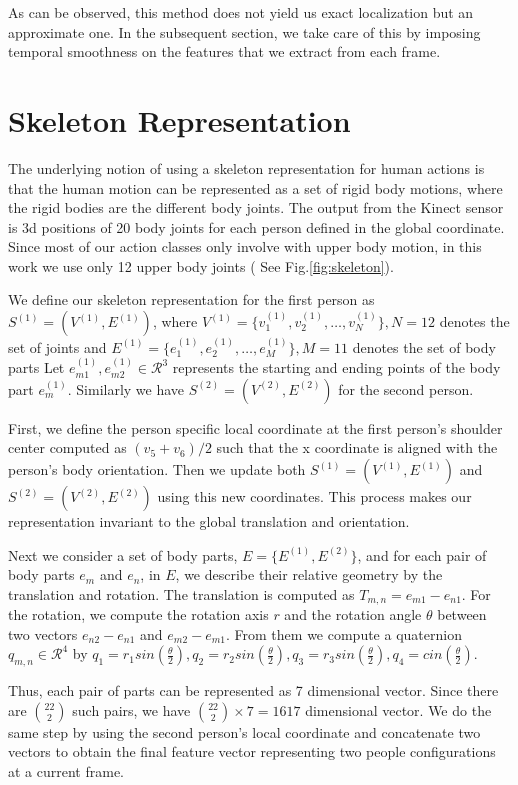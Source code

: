 \documentclass[10pt,twocolumn,letterpaper]{article}
\begin{document}
As can be observed, this method does not yield us exact localization but an approximate one. In the subsequent section, we take care of this by imposing temporal smoothness on the features that we extract from each frame. 


\section{Skeleton Representation}\label{sec:Feat}

The underlying notion of using a skeleton representation for human actions is that the human motion can be represented as a set of rigid body motions, where the rigid bodies are the different body joints. The output from the Kinect sensor is 3d positions of 20 body joints for each person defined in the global coordinate. Since most of our action classes only involve with upper body motion, in this work we use only 12 upper body joints ( See Fig.\ref{fig:skeleton}).

We define our skeleton representation for the first person as $S^{(1)}=(V^{(1)},E^{(1)})$, where $V^{(1)}=\{v_{1}^{(1)},v_{2}^{(1)},\dots,v_{N}^{(1)}\}, N=12$ denotes the set of joints and $E^{(1)}=\{e_{1}^{(1)},e_{2}^{(1)},\dots,e_{M}^{(1)}\}, M=11$ denotes the set of body parts  Let $e_{m1}^{(1)},e_{m2}^{(1)} \in \mathcal{R}^3$ represents the starting and ending points of the body part $e_{m}^{(1)}$. Similarly we have $S^{(2)}=(V^{(2)},E^{(2)})$ for the second person.

First, we define the person specific local coordinate at the first person's shoulder center computed as $(v_5 + v_6)/2$ such that the x coordinate is aligned with the person's body orientation. Then we update both $S^{(1)}=(V^{(1)},E^{(1)})$ and $S^{(2)}=(V^{(2)},E^{(2)})$ using this new coordinates. This process makes our representation invariant to the global translation and orientation. 

Next we consider a set of body parts, $E=\{E^{(1)},E^{(2)}\}$, and for each pair of body parts $e_m$ and $e_n$, in $E$, we describe their relative geometry by the translation and rotation. The translation is computed as $T_{m,n}=e_{m1}-e_{n1}$. For the rotation, we compute the rotation axis $r$ and the rotation angle $\theta$ between two vectors $e_{n2}-e_{n1}$ and $e_{m2}-e_{m1}$. From them we compute a quaternion $q_{m,n} \in \mathcal{R}^4$ by $q_1=r_1 sin( \frac{\theta}{2} ), q_2=r_2 sin( \frac{\theta}{2} ), q_3=r_3 sin( \frac{\theta}{2}), q_4=cin( \frac{\theta}{2})$.

Thus, each pair of parts can be represented as 7 dimensional vector. Since there are $\binom{22}{2}$ such pairs, we have $\binom{22}{2} \times 7 = 1617$ dimensional vector. We do the same step by using the second person's local coordinate and concatenate two vectors to obtain the final feature vector representing two people configurations at a current frame.
\end{document}
